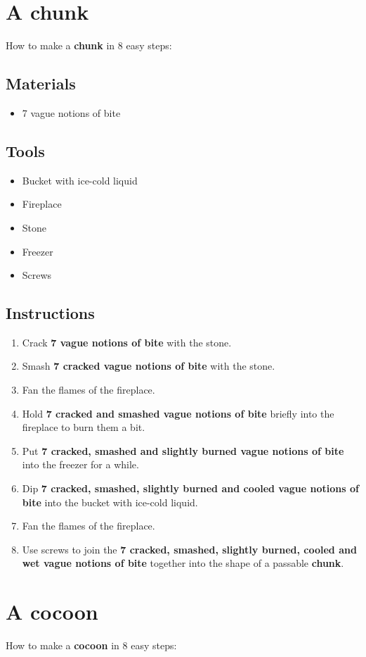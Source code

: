 \documentclass{article}
\begin{document}
\section{A chunk}How to make a \textbf{chunk} in 8 easy steps:

\subsection{Materials}\begin{itemize}
\item 
7 vague notions of bite
\end{itemize}
\subsection{Tools}\begin{itemize}
\item 
Bucket with ice-cold liquid
\item 
Fireplace
\item 
Stone
\item 
Freezer
\item 
Screws
\end{itemize}
\subsection{Instructions}\begin{enumerate}
\item 
Crack \textbf{7 vague notions of bite} with the stone.
\item 
Smash \textbf{7 cracked vague notions of bite} with the stone.
\item 
Fan the flames of the fireplace.
\item 
Hold \textbf{7 cracked and smashed vague notions of bite} briefly into the fireplace to burn them a bit.
\item 
Put \textbf{7 cracked, smashed and slightly burned vague notions of bite} into the freezer for a while.
\item 
Dip \textbf{7 cracked, smashed, slightly burned and cooled vague notions of bite} into the bucket with ice-cold liquid.
\item 
Fan the flames of the fireplace.
\item 
Use screws to join the \textbf{7 cracked, smashed, slightly burned, cooled and wet vague notions of bite} together into the shape of a passable \textbf{chunk}.
\end{enumerate}
\newpage
\section{A cocoon}How to make a \textbf{cocoon} in 8 easy steps:
\end{document}
